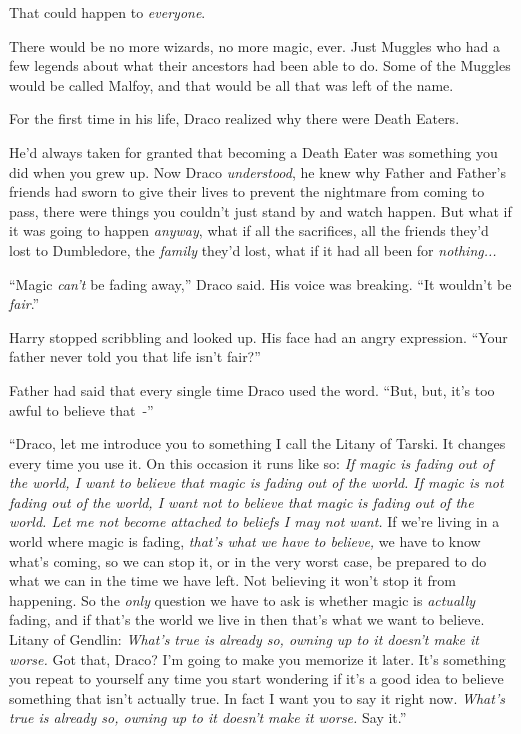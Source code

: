 That could happen to \emph{everyone}.

There would be no more wizards, no more magic, ever. Just Muggles who had a few legends about what their ancestors had been able to do. Some of the Muggles would be called Malfoy, and that would be all that was left of the name.

For the first time in his life, Draco realized why there were Death Eaters.

He'd always taken for granted that becoming a Death Eater was something you did when you grew up. Now Draco \emph{understood}, he knew why Father and Father's friends had sworn to give their lives to prevent the nightmare from coming to pass, there were things you couldn't just stand by and watch happen. But what if it was going to happen \emph{anyway}, what if all the sacrifices, all the friends they'd lost to Dumbledore, the \emph{family} they'd lost, what if it had all been for \emph{nothing...}

``Magic \emph{can't} be fading away,'' Draco said. His voice was breaking. ``It wouldn't be \emph{fair}.''

Harry stopped scribbling and looked up. His face had an angry expression. ``Your father never told you that life isn't fair?''

Father had said that every single time Draco used the word. ``But, but, it's too awful to believe that~-''

``Draco, let me introduce you to something I call the Litany of Tarski. It changes every time you use it. On this occasion it runs like so: \emph{If magic is fading out of the world, I want to believe that magic is fading out of the world. If magic is not fading out of the world, I want not to believe that magic is fading out of the world. Let me not become attached to beliefs I may not want.} If we're living in a world where magic is fading, \emph{that's what we have to believe,} we have to know what's coming, so we can stop it, or in the very worst case, be prepared to do what we can in the time we have left. Not believing it won't stop it from happening. So the \emph{only} question we have to ask is whether magic is \emph{actually} fading, and if that's the world we live in then that's what we want to believe. Litany of Gendlin: \emph{What's true is already so, owning up to it doesn't make it worse.} Got that, Draco? I'm going to make you memorize it later. It's something you repeat to yourself any time you start wondering if it's a good idea to believe something that isn't actually true. In fact I want you to say it right now. \emph{What's true is already so, owning up to it doesn't make it worse.} Say it.''

